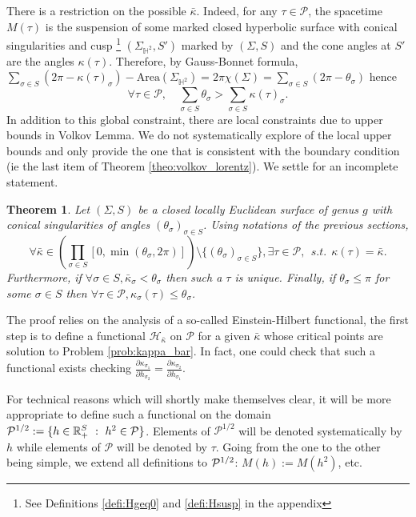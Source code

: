 \documentclass[a4paper,12pt]{article}
\def\H{\mathbb{H}}
\def\adm{\P}
\def\RR{\mathbb{R}}
\def\adm{\mathcal{P}}
\def\P{\mathcal{P}}
\newtheorem{theo}{Theorem}	%
\theoremstyle{definition}
\begin{document}
				
				There is a restriction on the possible $\bar\kappa$. Indeed, for any $\tau\in \adm$, the spacetime $M(\tau)$ is the suspension of some marked closed 
				hyperbolic surface with conical singularities and cusp 
				\footnote{See Definitions \ref{defi:Hgeq0} and \ref{defi:Hsusp} in the appendix} $(\Sigma_{\H^2}, S')$  marked by $(\Sigma,S)$ and the cone angles at $S'$ are the angles $\kappa(\tau)$. Therefore, by Gauss-Bonnet formula, 
				$\sum_{\sigma\in S} (2\pi-\kappa(\tau)_\sigma)- \mathrm{Area}(\Sigma_{\H^2}) = 2\pi\chi(\Sigma) = \sum_{\sigma\in S}(2\pi-\theta_\sigma)$
				hence 
				$$\forall \tau\in \adm,\quad \sum_{\sigma \in S} \theta_\sigma> \sum_{\sigma\in S}\kappa(\tau)_\sigma.$$
				In addition to this global constraint, there are local constraints due to upper bounds in Volkov Lemma. We do not systematically explore of the local upper bounds and only provide the one that is consistent with the boundary condition (ie the last item of Theorem \ref{theo:volkov_lorentz}).
				We settle for an incomplete statement.
				\begin{theo}\label{theo:closed_locally_euclidean_surface_2} 
				Let $(\Sigma,S)$ be a closed locally Euclidean surface of genus $g$ with conical singularities of angles $(\theta_\sigma)_{\sigma\in S}$.
				Using notations of the previous sections,
				$$\forall \bar\kappa\in \left(\prod_{\sigma\in S}[0,\min(\theta_\sigma,2\pi)]\right)\setminus \{(\theta_\sigma)_{\sigma\in S}\},\exists\tau\in \adm,~~s.t.~~ \kappa(\tau)=\bar\kappa.$$
				Furthermore, if $\forall \sigma\in S,\bar\kappa_\sigma<\theta_\sigma$ then such a $\tau$ is unique.
				Finally, if $\theta_\sigma\leq\pi$ for some $\sigma\in S$ then $\forall \tau\in \adm,\kappa_\sigma(\tau)\leq \theta_\sigma$.
			\end{theo}
				
				The proof relies on the analysis of a so-called Einstein-Hilbert functional, the first step is to define 
				a functional $\mathcal{H}_{\bar\kappa}$ on $\adm$ for a given $\bar\kappa$ whose critical points are solution to Problem \ref{prob:kappa_bar}. In fact, one could check that such a functional exists checking $\frac{\partial\kappa_{\sigma_1}}{\partial h_{\sigma_2}} = \frac{\partial\kappa_{\sigma_2}}{\partial h_{\sigma_1}} $.
				
				For technical reasons which will shortly make themselves clear, it will be more appropriate to define such a functional on the domain $\Psq:= \{h\in \RR_+^S~:~ h^2\in \adm\}$.
				Elements of $\adm^{1/2}$ will be denoted systematically by $h$ while elements of $\adm$ will be denoted by $\tau$. Going from the one to the other being simple, we extend all definitions to $\Psq$:
				$M(h):= M(h^2)$, etc.
				
\end{document}
